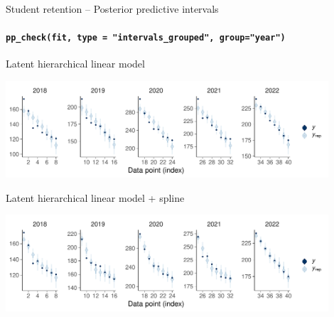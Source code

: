 \documentclass[t]{beamer}
\begin{document}
\begin{frame}[fragile]{Student retention -- Posterior predictive intervals}
\framesubtitle{\texttt{pp\_check(fit, type = "intervals\_grouped", group="year")}}

\vspace{-0.8\baselineskip}  
Latent hierarchical linear model\\  
  \hspace{-7mm}
  \begin{minipage}[t][3.6cm][t]{1.0\linewidth}
    \includegraphics[height=3.6cm]{student_retention_lbinom_ppc_intervals_grouped.pdf}
  \end{minipage}
  
\vspace{-0.5\baselineskip}  
Latent hierarchical linear model + spline\\  
  \hspace{-7mm}
  \begin{minipage}[t][3.6cm][t]{1.0\linewidth}
    \includegraphics[height=3.6cm]{student_retention_sbinom_ppc_intervals_grouped.pdf}
  \end{minipage}  

\end{frame}
\end{document}
